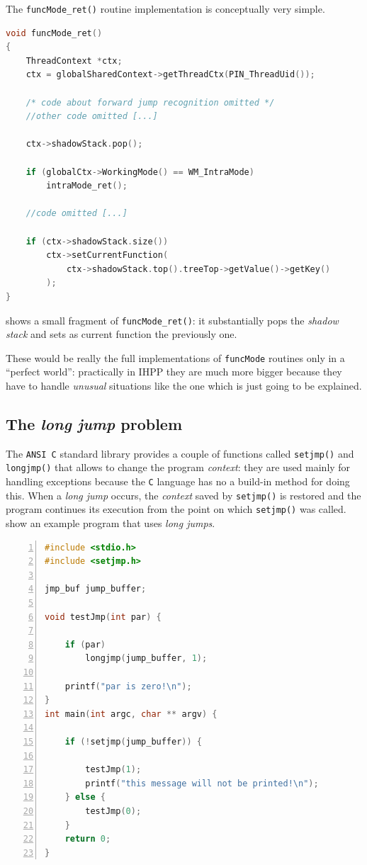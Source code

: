 \documentclass[a4paper,10pt]{report}
\begin{document}
The \verb|funcMode_ret()| routine implementation is conceptually very simple.

\begin{lstlisting}[language=C++, 
	caption={a fragment of \texttt{funcMode\_ret()} routine}, 
	label=funcret, frame=leftline]
void funcMode_ret()
{
	ThreadContext *ctx;
	ctx = globalSharedContext->getThreadCtx(PIN_ThreadUid());

	/* code about forward jump recognition omitted */
	//other code omitted [...]

	ctx->shadowStack.pop();

	if (globalCtx->WorkingMode() == WM_IntraMode)
		intraMode_ret();

	//code omitted [...]

	if (ctx->shadowStack.size())
		ctx->setCurrentFunction(
			ctx->shadowStack.top().treeTop->getValue()->getKey()
		);
}
\end{lstlisting}

\noindent
{} shows a small fragment of \verb|funcMode_ret()|: 
it substantially pops the \emph{shadow stack} and sets as current function
the previously one. 

These would be really the full implementations of \verb|funcMode| routines
only in a ``perfect world'': practically in IHPP they are much more bigger
because they have to handle \emph{unusual} situations like the one
which is just going to be explained.

\subsection{The \emph{long jump} problem}

The \verb|ANSI C| standard library provides a couple of functions called 
\verb|setjmp()| and \verb|longjmp()| that allows to change the program \emph{context}:
they are used mainly for handling exceptions because the \verb|C| language 
has no a build-in method for doing this. 
When a \emph{long jump} occurs, the \emph{context} saved by \verb|setjmp()| is restored
and the program continues its execution from the point on which \verb|setjmp()| was called.
 show an example program that uses \emph{long jumps}.

\begin{lstlisting}[language=C++, 
	caption={source code of \texttt{prog7.c}}, 
	label=longjmp1, frame=leftline, numbers=left, showstringspaces=false]
#include <stdio.h>
#include <setjmp.h>

jmp_buf jump_buffer;

void testJmp(int par) {

	if (par) 
		longjmp(jump_buffer, 1);

	printf("par is zero!\n");
}
int main(int argc, char ** argv) {

	if (!setjmp(jump_buffer)) {

		testJmp(1);
		printf("this message will not be printed!\n");	
	} else {
		testJmp(0);
	}	
	return 0;
}
\end{lstlisting}
\end{document}
